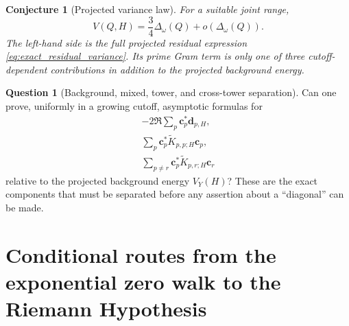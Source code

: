 \documentclass[11pt]{amsart}
\numberwithin{equation}{section}
\theoremstyle{plain}
\newtheorem{conjecture}[theorem]{Conjecture}
\theoremstyle{definition}
\newtheorem{question}[theorem]{Question}
\theoremstyle{remark}
\newcommand{\1}{\mathbf{1}}
\begin{document}
\begin{conjecture}[Projected variance law]
\label{conj:projected_variance_law}
For a suitable joint range,
\begin{equation}
V(Q,H)
=
\frac34\Delta_\omega(Q)
+
o\left(\Delta_\omega(Q)\right).
\label{eq:projected_variance_law}
\end{equation}
The left-hand side is the full projected residual expression
\eqref{eq:exact_residual_variance}.  Its prime Gram term is only one of
three cutoff-dependent contributions in addition to the projected
background energy.
\end{conjecture}

\begin{question}[Background, mixed, tower, and cross-tower separation]
\label{question:tower_cross_tower_separation}
Can one prove, uniformly in a growing cutoff, asymptotic formulas for
\begin{align}
-2\Re\sum_p\mathbf c_p^\ast\mathbf d_{p,H},
\label{eq:mixed_sum_target}
\\
\sum_p\mathbf c_p^\ast\widetilde K_{p,p;H}\mathbf c_p,
\label{eq:tower_sum_target}
\\
\sum_{p\neq r}\mathbf c_p^\ast\widetilde K_{p,r;H}\mathbf c_r
\label{eq:cross_tower_sum_target}
\end{align}
relative to the projected background energy $V_Y(H)$?  These are the exact
components that must be separated before any assertion about a
``diagonal'' can be made.
\end{question}




\section{Conditional routes from the exponential zero walk to the Riemann Hypothesis}
\label{sec:routes_to_RH}
\end{document}
